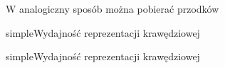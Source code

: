 W analogiczny sposób można pobierać przodków








%
%


\begin{qxtab}{simple}{Wydajność reprezentacji krawędziowej}
\end{qxtab}

\begin{qxfig}{simple}{Wydajność reprezentacji krawędziowej}
\end{qxfig}

